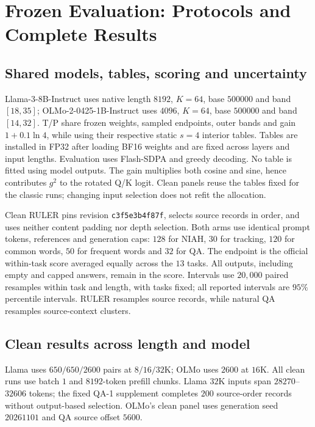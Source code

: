 \section{Frozen Evaluation: Protocols and Complete Results}
\label{sec:compact-frozen}\label{sec:completed-evidence}
\subsection{Shared models, tables, scoring and uncertainty}
Llama-$3$-$8$B-Instruct uses native length $8192$, $K=64$, base $500000$
and band $[18,35]$; OLMo-2-0425-1B-Instruct uses $4096$, $K=64$,
base $500000$ and band $[14,32]$. T/P share frozen weights, sampled endpoints,
outer bands and gain $1+0.1\ln4$, while using their respective static $s=4$
interior tables. Tables are installed in FP32 after loading BF16 weights and
are fixed across layers and input lengths. Evaluation uses Flash-SDPA and
greedy decoding. No table is fitted using model outputs.
The gain multiplies both cosine and sine, hence contributes $g^2$ to the
rotated Q/K logit. Clean panels reuse the tables fixed for the classic runs;
changing input selection does not refit the allocation.

Clean RULER pins revision \texttt{c3f5e3b4f87f}, selects source records in
order, and uses neither content padding nor depth selection. Both arms use
identical prompt tokens, references and generation caps: $128$ for NIAH,
$30$ for tracking, $120$ for common words, $50$ for frequent words and $32$
for QA. The endpoint is the official within-task score averaged equally
across the $13$ tasks. All outputs, including empty and capped answers,
remain in the score. Intervals use $20{,}000$ paired resamples within task
and length, with tasks fixed; all reported intervals are $95\%$ percentile
intervals. RULER resamples source records, while natural QA resamples
source-context clusters.

\subsection{Clean results across length and model}
\label{sec:clean-confirmation}\label{sec:clean16k-confirmation}
\label{sec:clean-native-new}\label{sec:olmo-clean-new}
Llama uses $650/650/2600$ pairs at $8/16/32$K; OLMo uses $2600$ at $16$K.
All clean runs use batch $1$ and $8192$-token prefill chunks. Llama $32$K
inputs span $28270$--$32606$ tokens; the fixed QA-1 supplement completes
$200$ source-order records without output-based selection. OLMo's clean
panel uses generation seed $20261101$ and QA source offset $5600$.




